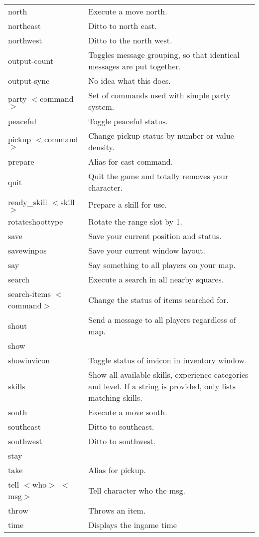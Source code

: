{\begin{longtable}{p{4cm}p{9cm}}
north & Execute a move north. \\ 
northeast & Ditto to north east. \\  
northwest & Ditto to the north west. \\ 
output-count & Toggles message grouping, so that identical messages are put together. \\ 
output-sync &  No idea what this does. \\
party $<$command$>$ & Set of commands used with simple party system. \\ 
peaceful & Toggle peaceful status. \\ 
pickup $<$command$>$ & Change pickup status by number or value density. \\ 
prepare & Alias for cast command. \\ 
quit & Quit the game and totally removes your character. \\ 
ready\_skill $<$skill$>$ & Prepare a skill for use. \\ 
rotateshoottype & Rotate the range slot by 1. \\ 
save & Save your current position and status. \\ 
savewinpos & Save your current window layout. \\ 
say & Say something to all players on your map. \\ 
search & Execute a search in all nearby squares.\\ 
search-items $<$command$>$ & Change the status of items searched for. \\ 
shout & Send a message to all players regardless of map.\\ 
show & \\ 
showinvicon & Toggle status of invicon in inventory window. \\ 
skills & Show all available skills, experience categories and level. If a string is provided, only lists matching skills.\\ 
south & Execute a move south.\\ 
southeast & Ditto to southeast. \\ 
southwest & Ditto to southwest. \\ 
stay & \\ 
take & Alias for pickup. \\ 
tell $<$who$>$ $<$msg$>$ & Tell character who the msg. \\ 
throw & Throws an item. \\ 
time & Displays the ingame time \\ 

\end{longtable}}
